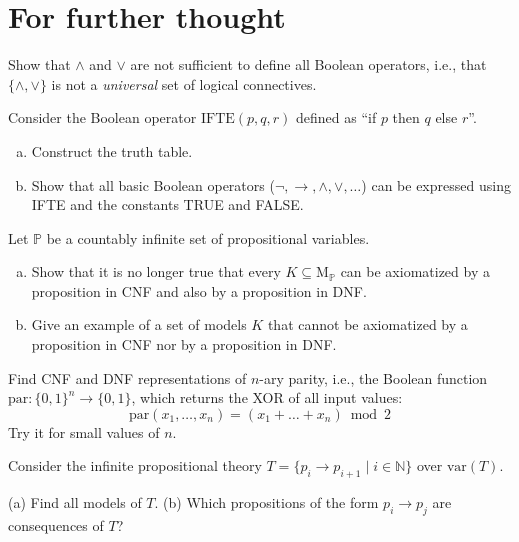 \section*{For further thought}


\begin{problem}
    
    Show that $\wedge$ and $\vee$ are not sufficient to define all Boolean operators, i.e., that $\{\wedge,\vee\}$ is not a \emph{universal} set of logical connectives.

\end{problem}


\begin{problem}
    
    Consider the Boolean operator $\mathrm{IFTE}(p, q, r)$ defined as “if $p$ then $q$ else $r$”. 
    \begin{enumerate}[(a)]
        \item Construct the truth table.
        \item Show that all basic Boolean operators ($\neg, \to, \wedge,\vee,\dots$) can be expressed using IFTE and the constants TRUE and FALSE.
    \end{enumerate}

\end{problem}


\begin{problem} 
    
    Let $\mathbb P$ be a countably infinite set of propositional variables.    
    \begin{enumerate}[(a)]
        \item Show that it is no longer true that every $K\subseteq \mathrm{M}_\mathbb P$ can be axiomatized by a proposition in CNF and also by a proposition in DNF.
        \item Give an example of a set of models $K$ that cannot be axiomatized by a proposition in CNF nor by a proposition in DNF.
    \end{enumerate}

\end{problem}


\begin{problem} 
    
    Find CNF and DNF representations of $n$-ary parity, i.e., the Boolean function $\mathrm{par}\colon\{0,1\}^n\to \{0,1\}$,
    which returns the XOR of all input values:
    $$
    \mathrm{par}(x_1,\dots,x_n)=(x_1+\dots+x_n)\bmod 2
    $$
    Try it for small values of $n$.

\end{problem}


\begin{problem}

    Consider the infinite propositional theory $T=\{p_i \to p_{i+1}\mid i\in \mathbb{N}\}$ over $\mathrm{var}(T)$. 
    
    (a) Find all models of $T$. \hfill (b) Which propositions of the form $p_i \to p_j$ are consequences of $T$?    

\end{problem}
